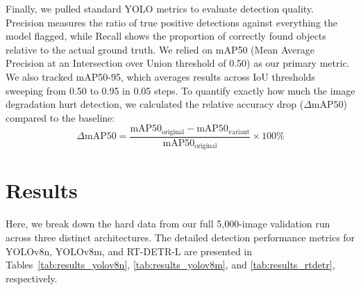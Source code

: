 \documentclass[12pt, a4paper]{article}
\begin{document}
Finally, we pulled standard YOLO metrics to evaluate detection quality. Precision measures the ratio of true positive detections against everything the model flagged, while Recall shows the proportion of correctly found objects relative to the actual ground truth. We relied on mAP50 (Mean Average Precision at an Intersection over Union threshold of 0.50) as our primary metric. We also tracked mAP50-95, which averages results across IoU thresholds sweeping from 0.50 to 0.95 in 0.05 steps. To quantify exactly how much the image degradation hurt detection, we calculated the relative accuracy drop ($\Delta \text{mAP50}$) compared to the baseline:
\begin{equation}
\Delta \text{mAP50} = \frac{\text{mAP50}_{\text{original}} - \text{mAP50}_{\text{variant}}}{\text{mAP50}_{\text{original}}} \times 100\%
\label{eq:map_drop}
\end{equation}


\section{Results}
Here, we break down the hard data from our full 5,000-image validation run across three distinct architectures. The detailed detection performance metrics for YOLOv8n, YOLOv8m, and RT-DETR-L are presented in Tables~\ref{tab:results_yolov8n}, \ref{tab:results_yolov8m}, and \ref{tab:results_rtdetr}, respectively.
\end{document}
